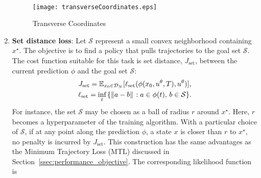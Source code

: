 \begin{enumerate}
\begin{align}
        \label{eq:track_likelihood}
    \end{align}
    \begin{figure}
        \centering
        \texttt{[image: transverseCoordinates.eps]}
        \caption{Transverse Coordinates}
        \label{fig:transverse}
    \end{figure}
    \item \textbf{Set distance loss}: Let $\mathcal{S}$ represent a small convex
    neighborhood containing $x^\star$. The objective is to find a policy that
    pulls trajectories to the goal set $\mathcal{S}$. The cost function suitable
    for this task is set distance, $J_{\textrm{set}}$, between the current
    prediction $\phi$ and the goal set $\mathcal{S}$:
    \begin{equation}
        \begin{gathered}
            J_{\textrm{set}} = \mathbb{E}_{x_0 \in \mathcal{D}_N}[ \ell_{\textrm{set}}( \phi(x_0, u^\theta, T), u^\theta) ], \\
            \ell_{\textrm{set}}
            = \underset{t}{\textrm{inf}} \, {\{ \|{a - b}\|_{{}_{}}: a \in \phi(t),\, b \in \mathcal{S} \}}.  
        \end{gathered}
          \label{eq:set_distance}
    \end{equation}
    For instance, the set $\mathcal{S}$ may be chosen as a ball of radius
    $r$ around $x^\star$. 
    Here, $r$ becomes a hyperparameter of the training algorithm. With a
    particular choice of $\mathcal{S}$, if at any point along the prediction
    $\phi$, a state $x$ is closer than $r$ to $x^\star$, no penalty is
    incurred by $J_{\textrm{set}}$. This construction has the same advantages as the Minimum Trajectory Loss (MTL) discussed in Section~\ref{ssec:performance_objective}. The corresponding likelihood function is

\end{enumerate}
